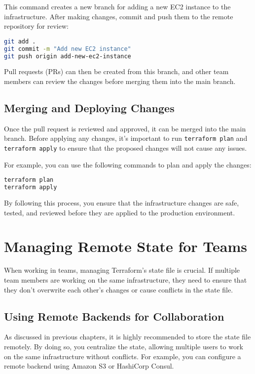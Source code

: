 This command creates a new branch for adding a new EC2 instance to the infrastructure. After making changes, commit and push them to the remote repository for review:

\begin{lstlisting}[language=bash]
git add .
git commit -m "Add new EC2 instance"
git push origin add-new-ec2-instance
\end{lstlisting}

Pull requests (PRs) can then be created from this branch, and other team members can review the changes before merging them into the main branch.

\subsection{Merging and Deploying Changes}

Once the pull request is reviewed and approved, it can be merged into the main branch. Before applying any changes, it's important to run \texttt{terraform plan} and \texttt{terraform apply} to ensure that the proposed changes will not cause any issues.

For example, you can use the following commands to plan and apply the changes:

\begin{lstlisting}[language=bash]
terraform plan
terraform apply
\end{lstlisting}

By following this process, you ensure that the infrastructure changes are safe, tested, and reviewed before they are applied to the production environment.

\section{Managing Remote State for Teams}

When working in teams, managing Terraform's state file is crucial. If multiple team members are working on the same infrastructure, they need to ensure that they don't overwrite each other's changes or cause conflicts in the state file.

\subsection{Using Remote Backends for Collaboration}

As discussed in previous chapters, it is highly recommended to store the state file remotely. By doing so, you centralize the state, allowing multiple users to work on the same infrastructure without conflicts. For example, you can configure a remote backend using Amazon S3 or HashiCorp Consul.


